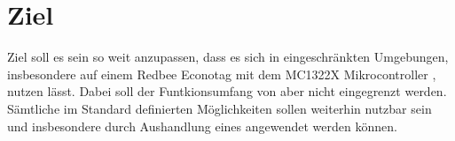 \section{Ziel}
Ziel soll es sein  so weit anzupassen, dass es sich in eingeschränkten Umgebungen, insbesondere auf einem Redbee Econotag \cite{econotag} mit dem
MC1322X Mikrocontroller \cite{mc1322x}, nutzen lässt. Dabei soll der Funtkionsumfang von  aber nicht eingegrenzt werden. Sämtliche im Standard
definierten Möglichkeiten sollen weiterhin nutzbar sein und insbesondere durch Aushandlung eines  angewendet werden können.